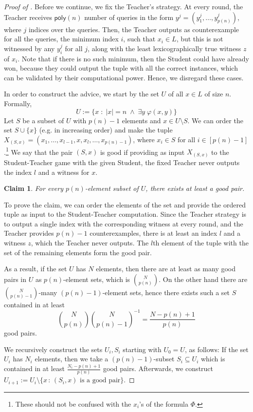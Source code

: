 \documentclass[11pt]{article}
\newcommand{\poly}{\mathsf{poly}}
\newcommand{\abs}[1]{\lvert #1 \rvert}
\newtheorem{claim}[theorem]{Claim}
\theoremstyle{definition}
\theoremstyle{definition}
\theoremstyle{remark}
\begin{document}
\begin{proof}[Proof of ]
    Before we continue, we fix the Teacher's strategy. At every round, the Teacher receives $\poly(n)$ number of queries in the form $y^{j}=(y^{j}_{1},\dots,y^{j}_{p(n)})$, where $j$ indices over the queries. Then, the Teacher outputs as counterexample for all the queries, the minimum index $i$, such that $x_i\in L$, but this is not witnessed by any $y^{j}_i$ for all $j$, along with the least lexicographically true witness $z$ of $x_i$. Note that if there is no such minimum, then the Student could have already won, because they could output the tuple with all the correct instances, which can be validated by their computational power. Hence, we disregard these cases.
    
    In order to construct the advice, we start by the set $U$ of all $x\in L$ of size $n$. Formally, $$U:=\{x\;:\; \abs{x}=n \;\land \; \exists y \;\varphi(x,y)\}$$ 
    Let $S$ be a subset of $U$ with $p(n)-1$ elements and $x\in U\setminus S$. We can order the set $S\cup \{x\}$ (e.g. in increasing order) and make the tuple $X_{(S,x)}= (x_1,\dots,x_{l-1}, x, x_l,\dots,x_{p(n)-1})$, where $x_i\in S$ for all $i\in [p(n)-1]$.\footnote{These should not be confused with the $x_i$'s of the formula $\Phi$.} We say that the pair $(S,x)$ is good if providing as input $X_{(S,x)}$ to the Student-Teacher game with the given Student, the fixed Teacher never outputs the index $l$ and a witness for $x$. 

    \begin{claim}
        For every $p(n)$-element subset of $U$, there exists at least a good pair.
    \end{claim}
    To prove the claim, we can order the elements of the set and provide the ordered tuple as input to the Student-Teacher computation. Since the Teacher strategy is to output a single index with the corresponding witness at every round, and the Teacher provides $p(n)-1$ counterexamples, there is at least an index $l$ and a witness $z$, which the Teacher never outputs. The $l$th element of the tuple with the set of the remaining elements form the good pair.
    
    As a result, if the set $U$ has $N$ elements, then there are at least as many good pairs in $U$ as $p(n)$-element sets, which is $\binom{N}{p(n)}$.
    On the other hand there are $\binom{N}{p(n)-1}$-many $(p(n)-1)$-element sets, hence there exists such a set $S$ contained in at least 
    \[
    \binom{N}{p(n)}\binom{N}{p(n)-1}^{-1} = \frac{N-p(n)+1}{p(n)}
    \]
    good pairs.

    We recursively construct the sets $U_i,S_i$ starting with $U_0=U$, as follows:
    If the set $U_i$ has $N_i$ elements, then we take a $(p(n)-1)$-subset $S_i\subseteq U_i$ which is contained in at least $\frac{N_i-p(n)+1}{p(n)}$ good pairs. Afterwards, we construct $U_{i+1}:=U_i\setminus\{x\,:\,(S_i,x) \text{ is a good pair}\}$.


\end{proof}
\end{document}
